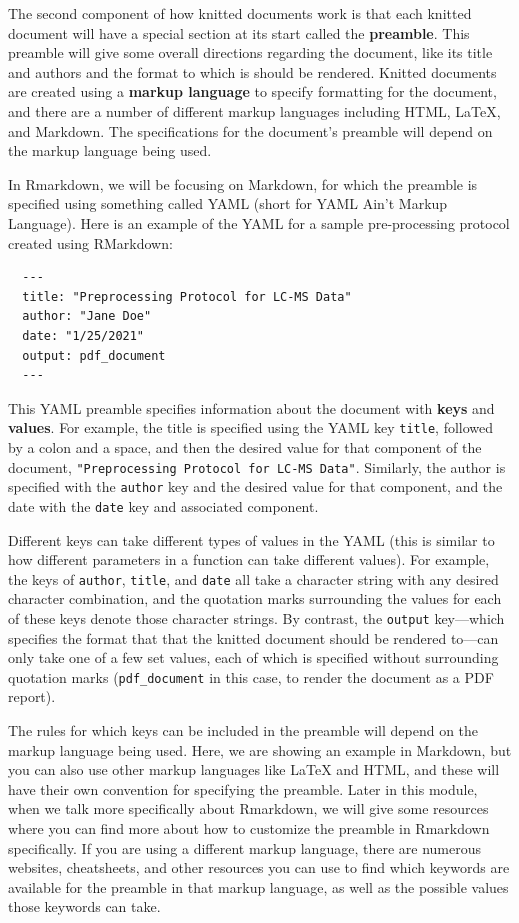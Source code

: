 \documentclass[]{tufte-book}
\begin{document}
The second component of how knitted documents work is that each knitted document
will have a special section at its start called the \textbf{preamble}. This preamble
will give some overall directions regarding the document, like its title and
authors and the format to which is should be rendered. Knitted documents are
created using a \textbf{markup language} to specify formatting for the document, and
there are a number of different markup languages including HTML, LaTeX, and
Markdown. The specifications for the document's preamble will depend on the
markup language being used.

In Rmarkdown, we will be focusing on Markdown, for which the preamble is
specified using something called YAML (short for YAML Ain't Markup Language).
Here is an example of the YAML for a sample pre-processing protocol created
using RMarkdown:

\begin{verbatim}
  ---
  title: "Preprocessing Protocol for LC-MS Data"
  author: "Jane Doe"
  date: "1/25/2021"
  output: pdf_document
  ---
\end{verbatim}

This YAML preamble specifies information about the document with \textbf{keys} and
\textbf{values}. For example, the title is specified using the YAML key \texttt{title},
followed by a colon and a space, and then the desired value for that
component of the document, \texttt{"Preprocessing\ Protocol\ for\ LC-MS\ Data"}.
Similarly, the author is specified with the \texttt{author} key and the desired
value for that component, and the date with the \texttt{date} key and associated
component.

Different keys can take different types of values in the YAML
(this is similar to how different parameters in a function can take different values). For example, the keys of \texttt{author}, \texttt{title}, and \texttt{date} all take
a character string with any desired character combination, and the quotation
marks surrounding the values for each of these keys denote those character strings. By contrast, the \texttt{output} key---which specifies the format that
that the knitted document should be rendered to---can only take one of a
few set values, each of which is specified without surrounding
quotation marks (\texttt{pdf\_document} in this case, to render the document
as a PDF report).

The rules for which keys can be included in the preamble will depend on the
markup language being used. Here, we are showing an example in Markdown, but you
can also use other markup languages like LaTeX and HTML, and these will have
their own convention for specifying the preamble. Later in this module, when we
talk more specifically about Rmarkdown, we will give some resources where you
can find more about how to customize the preamble in Rmarkdown specifically. If
you are using a different markup language, there are numerous websites,
cheatsheets, and other resources you can use to find which keywords are
available for the preamble in that markup language, as well as the possible
values those keywords can take.
\end{document}
